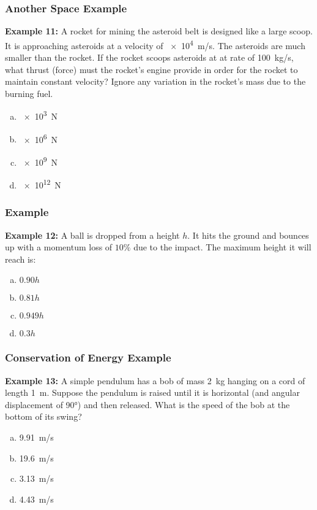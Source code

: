 \documentclass[12pt,compress,aspectratio=169]{beamer}
\begin{document}
\begin{frame}
  \frametitle{Another Space Example}
  \textbf{Example 11:} A rocket for mining the asteroid belt is designed like a
  large scoop. It is approaching asteroids at a velocity of \SI{e4}{m/s}. The
  asteroids are much smaller than the rocket. If the rocket scoops asteroids at
  at rate of \SI{100}{kg/s}, what thrust (force) must the rocket's engine
  provide in order for the rocket to maintain constant velocity? Ignore any
  variation in the rocket's mass due to the burning fuel.
  \begin{enumerate}[(a)]
  \item \SI{e3}{\newton}
  \item \SI{e6}{\newton}
  \item \SI{e9}{\newton}
  \item \SI{e12}{\newton}
  \end{enumerate}
\end{frame}


\begin{frame}
  \frametitle{Example}
  \textbf{Example 12:} A ball is dropped from a height $h$. It hits the ground
  and bounces up with a momentum loss of $10\%$ due to the impact. The maximum
  height it will reach is:
  \begin{enumerate}[(a)]
  \item $0.90h$
  \item $0.81h$
  \item $0.949h$
  \item $0.3h$
  \end{enumerate}
\end{frame}

\begin{frame}
  \frametitle{Conservation of Energy Example}
  \textbf{Example 13:} A simple pendulum has a bob of mass \SI{2}{kg} hanging
  on a cord of length \SI{1}{m}. Suppose the pendulum is raised until it is
  horizontal (and angular displacement of \ang{90}) and then released. What is
  the speed of the bob at the bottom of its swing?
  \begin{enumerate}[(a)]
  \item\SI{9.91}{m/s}
  \item\SI{19.6}{m/s}
  \item\SI{3.13}{m/s}
  \item\SI{4.43}{m/s}
  \end{enumerate}
\end{frame}
 
\end{document}
